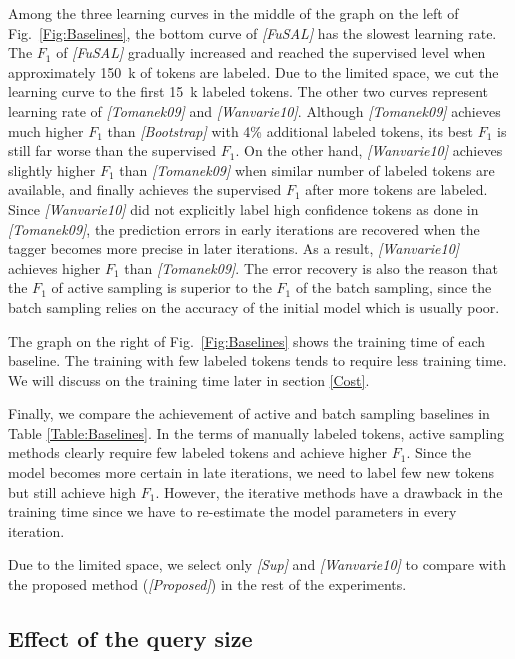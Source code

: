 \documentclass[english]{jnlp_JS2.0}
\begin{document}
Among the three learning curves in the middle of the graph on the left of Fig.~\ref{Fig:Baselines}, the bottom curve of \textit{[FuSAL]} has the slowest learning rate. The $F_1$ of \textit{[FuSAL]} gradually increased and reached the supervised level when approximately 150~k of tokens are labeled. Due to the limited space, we cut the learning curve to the first 15~k labeled tokens. The other two curves represent learning rate of \textit{[Tomanek09]} and \textit{[Wanvarie10]}. Although \textit{[Tomanek09]} achieves much higher $F_1$ than \textit{[Bootstrap]} with 4\% additional labeled tokens, its best $F_1$ is still far worse than the supervised $F_1$. On the other hand, \textit{[Wanvarie10]} achieves slightly higher $F_1$ than \textit{[Tomanek09]} when similar number of labeled tokens are available, and finally achieves the supervised $F_1$ after more tokens are labeled. Since \textit{[Wanvarie10]} did not explicitly label high confidence tokens as done in \textit{[Tomanek09]}, the prediction errors in early iterations are recovered when the tagger becomes more precise in later iterations.  As a result, \textit{[Wanvarie10]} achieves higher $F_1$ than \textit{[Tomanek09]}. The error recovery is also the reason that the $F_1$ of active sampling is superior to the $F_1$ of the batch sampling, since the batch sampling relies on the accuracy of the initial model which is usually poor.

The graph on the right of Fig.~\ref{Fig:Baselines} shows the training time of each baseline. The training with few labeled tokens tends to require less training time. We will discuss on the training time later in section \ref{Cost}.

Finally, we compare the achievement of active and batch sampling baselines in Table \ref{Table:Baselines}. In the terms of manually labeled tokens, active sampling methods clearly require few labeled tokens and achieve higher $F_1$. Since the model becomes more certain in late iterations, we need to label few new tokens but still achieve high $F_1$. However, the iterative methods have a drawback in the training time since we have to re-estimate the model parameters in every iteration.

Due to the limited space, we select only \textit{[Sup]} and \textit{[Wanvarie10]} to compare with the proposed method (\textit{[Proposed]}) in the rest of the experiments.


\subsection{Effect of the query size}
\label{QuerySize}
\end{document}
